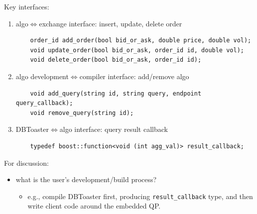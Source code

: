 \documentclass{article}
\newcommand{\compiler}{DBToaster}
\begin{document}
Key interfaces:
\begin{enumerate}
\item algo$\iff$exchange interface: insert, update, delete order
\begin{verbatim}
	order_id add_order(bool bid_or_ask, double price, double vol);
	void update_order(bool bid_or_ask, order_id id, double vol);
	void delete_order(bool bid_or_ask, order_id id);
\end{verbatim}

\item algo development$\iff$compiler interface: add/remove algo
\begin{verbatim}
	void add_query(string id, string query, endpoint query_callback);
	void remove_query(string id);
\end{verbatim}
 
\item DBToaster$\iff$algo interface: query result callback
\begin{verbatim}
	typedef boost::function<void (int agg_val)> result_callback;
\end{verbatim}
\end{enumerate}

For discussion:
\begin{itemize}
\item what is the user's development/build process?
  \begin{itemize}
  \item e.g., compile DBToaster first, producing \texttt{result\_callback} type,
		and then write client code around the embedded QP.
  \end{itemize}
\end{itemize}

\end{document}
